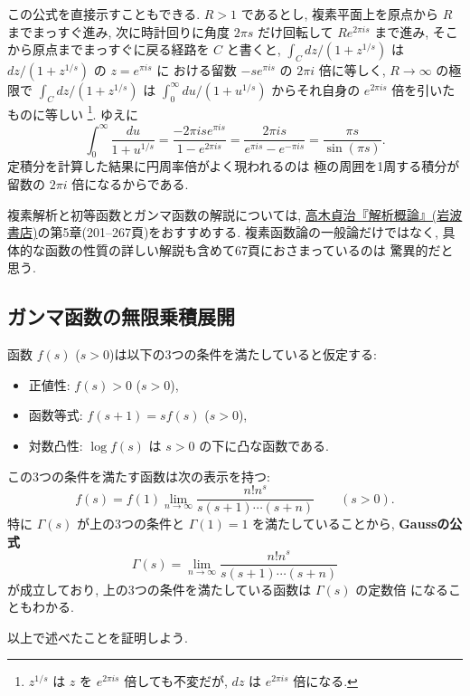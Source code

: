\documentclass[12pt,twoside]{jarticle}
\theoremstyle{jplain}
\theoremstyle{jplain}
\theoremstyle{jplain}
\numberwithin{theorem}{section}
\numberwithin{equation}{section}
\numberwithin{figure}{section}
\numberwithin{table}{section}
\begin{document}
この公式を直接示すこともできる.
$R>1$ であるとし, 
複素平面上を原点から $R$ までまっすぐ進み,
次に時計回りに角度 $2\pi s$ だけ回転して $Re^{2\pi is}$ まで進み, 
そこから原点までまっすぐに戻る経路を $C$ と書くと, 
$\int_C dz/(1+z^{1/s})$ は $dz/(1+z^{1/s})$ の $z=e^{\pi is}$ に
おける留数 $-s e^{\pi is}$ の $2\pi i$ 倍に等しく,
$R\to\infty$ の極限で $\int_C dz/(1+z^{1/s})$ 
は $\int_0^\infty du/(1+u^{1/s})$ からそれ自身の $e^{2\pi is}$ 倍を引いた
ものに等しい%
\footnote{$z^{1/s}$ は $z$ を $e^{2\pi is}$ 倍しても不変だが, 
$dz$ は $e^{2\pi is}$ 倍になる.}. ゆえに
\[
\int_0^\infty \frac{du}{1+u^{1/s}}
=\frac{-2\pi is e^{\pi is}}{1-e^{2\pi is}}
=\frac{2\pi is}{e^{\pi is}-e^{-\pi is}}
=\frac{\pi s}{\sin(\pi s)}.
\]
定積分を計算した結果に円周率倍がよく現われるのは
極の周囲を1周する積分が留数の $2\pi i$ 倍になるからである. 

複素解析と初等函数とガンマ函数の解説については, 
\href{http://www.amazon.co.jp/dp/4000051717}
{高木貞治『解析概論』(岩波書店)}の第5章(201--267頁)をおすすめする.
複素函数論の一般論だけではなく, 
具体的な函数の性質の詳しい解説も含めて67頁におさまっているのは
驚異的だと思う.


\subsection{ガンマ函数の無限乗積展開}
\label{sec:Gamma-prod}

函数 $f(s)$ ($s>0$)は以下の3つの条件を満たしていると仮定する:
\begin{itemize}
\item 正値性: $f(s)>0$ ($s>0$),
\item 函数等式: $f(s+1)=sf(s)$ ($s>0$),
\item 対数凸性: $\log f(s)$ は $s>0$ の下に凸な函数である.
\end{itemize}
この3つの条件を満たす函数は次の表示を持つ:
\[
f(s) = f(1)\lim_{n\to\infty}\frac{n!n^s}{s(s+1)\cdots(s+n)}
\qquad (s>0).
\tag{$*$}
\]
特に $\Gamma(s)$ が上の3つの条件と $\Gamma(1)=1$ を満たしていることから, 
{\bf Gaussの公式}
\[
\Gamma(s)=\lim_{n\to\infty}\frac{n!n^s}{s(s+1)\cdots(s+n)}
\]
が成立しており, 上の3つの条件を満たしている函数は $\Gamma(s)$ の定数倍
になることもわかる.

以上で述べたことを証明しよう.
\end{document}
